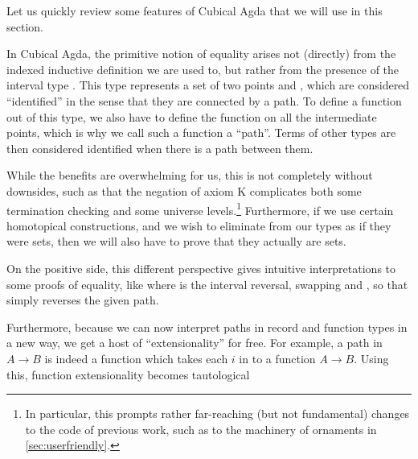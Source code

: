 Let us quickly review some features of Cubical Agda \cite{cuagda} that we will use in this section.

In Cubical Agda, the primitive notion of equality arises not (directly) from the indexed inductive definition we are used to, but rather from the presence of the interval type . This type represents a set of two points  and , which are considered ``identified'' in the sense that they are connected by a path. To define a function out of this type, we also have to define the function on all the intermediate points, which is why we call such a function a ``path''. Terms of other types are then considered identified when there is a path between them.

While the benefits are overwhelming for us, this is not completely without downsides, such as that
the negation of axiom K complicates both some termination checking and some universe levels.\footnote{In particular, this prompts rather far-reaching (but not fundamental) changes to the code of previous work, such as to the machinery of ornaments \cite{progorn} in \autoref{sec:userfriendly}.} Furthermore, if we use certain homotopical constructions, and we wish to eliminate from our types as if they were sets, then we will also have to prove that they actually are sets.

On the positive side, this different perspective gives intuitive interpretations to some proofs of equality, like
where  is the interval reversal, swapping  and , so that  simply reverses the given path.

Furthermore, because we can now interpret paths in record and function types in a new way, we get a host of ``extensionality'' for free. For example, a path in $A \to B$ is indeed a function which takes each $i$ in  to a function $A \to B$. Using this, function extensionality becomes tautological 

